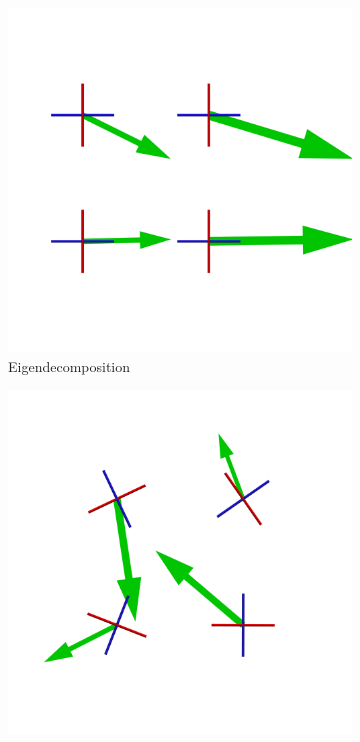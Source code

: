 \begin{figure}
    \begin{subfigure}[b]{0.49\textwidth}
        \includegraphics[trim=0 350 0 100, clip=true, width=\textwidth]{Images/sampleEig.png}
        \caption{Eigendecomposition}
        \label{fig:sampleEig}
    \end{subfigure}
    \centering
    \begin{subfigure}[b]{0.49\textwidth}
        \includegraphics[trim=0 350 0 100, clip=true, width=\textwidth]{Images/sampleChol.png}

\end{subfigure}
\end{figure}

